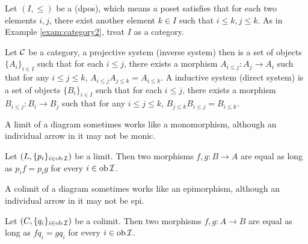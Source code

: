 \begin{exam}
  Let $(I,\leqslant)$ be a  (dpos), which means a poset satisfies that for each two elements $i,j$, there exist another element $k\in I$ such that $i\leqslant k,j\leqslant k$. As in Example \ref{exam:category2}, treat $I$ as a category.

  Let ${\cal C}$ be a category, a projective system (inverse system) then is a set of objects $\{A_i\}_{i\in I}$ such that for each $i\leqslant j$, there exists a morphism $A_{i\leqslant j}\colon A_j\to A_i$ such that for any $i\leqslant j\leqslant k$, $A_{i\leqslant j}A_{j\leqslant k}=A_{i\leqslant k}$.
  A inductive system (direct system) is a set of objects $\{B_i\}_{i\in I}$ such that for each $i\leqslant j$, there exists a morphism $B_{i\leqslant j}\colon B_i\to B_j$ such that for any $i\leqslant j\leqslant k$, $B_{j\leqslant k}B_{i\leqslant j}=B_{i\leqslant k}$.
\end{exam}

A limit of a diagram sometimes works like a monomorphism, although an individual arrow in it may not be monic.
\begin{prop}\label{prop:globalmonic}
  Let $(L,\{p_i\}_{i\in\operatorname{ob}{\cal I}})$ be a limit. Then two morphisms $f,g\colon B\to A$ are equal as long as $p_if=p_ig$ for every $i\in\operatorname{ob}{\cal I}$.
\end{prop}

A colimit of a diagram sometimes works like an epimorphism, although an individual arrow in it may not be epi.
\begin{prop}\label{prop:globalepi}
  Let $(C,\{q_i\}_{i\in\operatorname{ob}{\cal I}})$ be a colimit. Then two morphisms $f,g\colon A\to B$ are equal as long as $fq_i=gq_i$ for every $i\in\operatorname{ob}{\cal I}$.
\end{prop}

